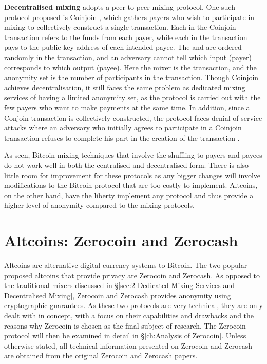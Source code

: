 \textbf{Decentralised mixing} adopts a peer-to-peer mixing protocol. One such protocol proposed is Coinjoin \cite{Gmaxwell2013}, which gathers payers who wish to participate in mixing to collectively construct a single transaction. Each \kwInput{} in the Coinjoin transaction refers to the funds from each payer, while each \kwOutput{} in the transaction pays to the public key address of each intended payee. The  and  are ordered randomly in the transaction, and an adversary cannot tell which input (payer) corresponds to which output (payee). Here the mixer is the transaction, and the anonymity set is the number of participants in the transaction. Though Coinjoin achieves decentralisation, it still faces the same problem as dedicated mixing services of having a limited anonymity set, as the protocol is carried out with the few payers who want to make payments at the same time. In addition, since a Conjoin transaction is collectively constructed, the protocol faces denial-of-service attacks where an adversary who initially agrees to participate in a Coinjoin transaction refuses to complete his part in the creation of the transaction \cite{narayanan2016bitcoin}.

As seen, Bitcoin mixing techniques that involve the shuffling to payers and payees do not work well in both the centralised and decentralised form. There is also little room for improvement for these protocols as any bigger changes will involve modifications to the Bitcoin protocol that are too costly to implement. Altcoins, on the other hand, have the liberty implement any protocol and thus provide a higher level of anonymity compared to the mixing protocols.

\section{Altcoins: Zerocoin and Zerocash}
\label{sec:2-Altcoins: Zerocoin and Zerocash}
Altcoins are alternative digital currency systems to Bitcoin. The two popular proposed altcoins that provide privacy are Zerocoin and Zerocash. As opposed to the traditional mixers discussed in \S\ref{sec:2-Dedicated Mixing Services and Decentralised Mixing}, Zerocoin and Zerocash provides anonymity using cryptographic guarantees. As these two protocols are very technical, they are only dealt with in concept, with a focus on their capabilities and drawbacks and the reasons why Zerocoin is chosen as the final subject of research. The Zerocoin protocol will then be examined in detail in \S\ref{ch:Analysis of Zerocoin}. Unless otherwise stated, all technical information presented on Zerocoin and Zerocash are obtained from the original Zerocoin \cite{Miers2013} and Zerocash \cite{Ben-Sasson2014} papers.

